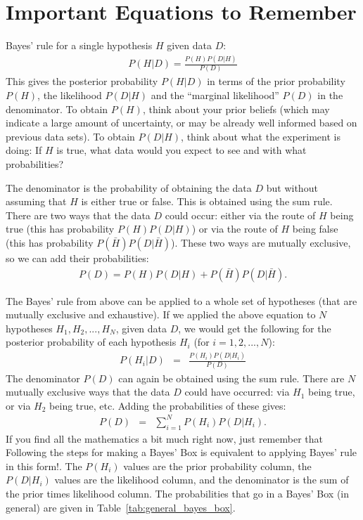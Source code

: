 \section{Important Equations to Remember}
Bayes' rule for a single hypothesis $H$ given data $D$:
\begin{eqnarray}
P(H|D) = \frac{P(H)P(D|H)}{P(D)}
\end{eqnarray}
This gives the posterior probability $P(H|D)$ in terms of the prior probability
$P(H)$, the likelihood $P(D|H)$ and the ``marginal likelihood'' $P(D)$ in the
denominator. To obtain $P(H)$, think about your prior beliefs (which may
indicate a large amount of uncertainty, or may be already well informed based
on previous data sets). To obtain $P(D|H)$, think about what the experiment is
doing: If $H$ is true, what data would you expect to see and with what
probabilities?

The denominator is the probability of obtaining the data $D$ but without
assuming that $H$ is either true or false. This is obtained using the sum rule.
There are two ways that the data $D$ could occur: either via the route of $H$
being true (this has probability $P(H)P(D|H)$) or via the route of $H$ being
false (this has probability $P(\bar{H})P(D|\bar{H})$). These two ways are
mutually exclusive, so we can add their probabilities:
\begin{eqnarray}
P(D) = P(H)P(D|H) + P(\bar{H})P(D|\bar{H}).
\end{eqnarray}

The Bayes' rule from above can be applied to a whole set
of hypotheses (that are mutually exclusive and exhaustive). If we applied the
above equation to $N$ hypotheses
$H_1, H_2, ..., H_N$, given data $D$, we would get the following for the posterior
probability of each hypothesis $H_i$ (for $i=1, 2, ..., N$):
\begin{eqnarray}
P(H_i|D) &=& \frac{P(H_i)P(D|H_i)}{P(D)}
\end{eqnarray}
The denominator $P(D)$ can again be obtained using the sum rule. There are $N$
mutually exclusive ways that the data $D$ could have occurred: via $H_1$ being
true, or via $H_2$ being true, etc. Adding the probabilities of these gives:
\begin{eqnarray}
P(D) &=& \sum_{i=1}^N P(H_i)P(D|H_i).
\end{eqnarray}
If you find all the mathematics a bit much right now, just remember that
Following the steps for making a Bayes' Box is equivalent to applying
Bayes' rule in this form!. The $P(H_i)$ values are the prior probability column, the
$P(D|H_i)$ values are the likelihood column, and the denominator is the
sum of the prior times likelihood column. The probabilities that go in a Bayes'
Box (in general) are given in Table~\ref{tab:general_bayes_box}.

